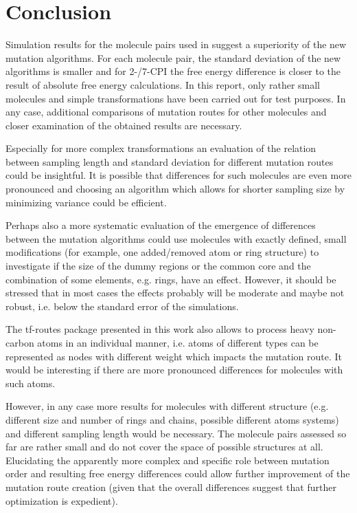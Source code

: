 \chapter{Conclusion}


Simulation results for the molecule pairs used in \cite{Loeffler.2018, Wieder.2022} suggest a superiority of the new mutation algorithms. For each molecule pair, the standard deviation of the new algorithms is smaller and for 2-/7-CPI the free energy difference is closer to the result of absolute free energy calculations. 
In this report, only rather small molecules and simple transformations have been carried out for test purposes. In any case, additional comparisons of mutation routes for other molecules and closer examination of the obtained results are necessary.

Especially for more complex transformations an evaluation of the relation between sampling length and standard deviation for different mutation routes could be insightful. 
It is possible that differences for such molecules are even more pronounced and choosing an algorithm which allows for shorter sampling size by minimizing variance could be efficient.

Perhaps also a more systematic evaluation of the emergence of differences between the mutation algorithms could use molecules with exactly defined, small modifications (for example, one added/removed atom or ring structure) to investigate if the size of the dummy regions or the common core and the combination of some elements, e.g. rings, have an effect. However, it should be stressed that in most cases the effects probably will be moderate and maybe not robust, i.e. below the standard error of the simulations.


The tf-routes package presented in this work also allows to process heavy non-carbon atoms in an individual manner, i.e. atoms of different types can be represented as nodes with different weight which impacts the mutation route. It would be interesting if there are more pronounced differences for molecules with such atoms.

However, in any case more results for molecules with different structure (e.g. different size and number of rings and chains, possible different atoms systems) and different sampling length would be necessary. The molecule pairs assessed so far are rather small and do not cover the space of possible structures at all.
Elucidating the apparently more complex and specific role between mutation order and resulting free energy differences could allow further improvement of the mutation route creation (given that the overall differences suggest that further optimization is expedient).

